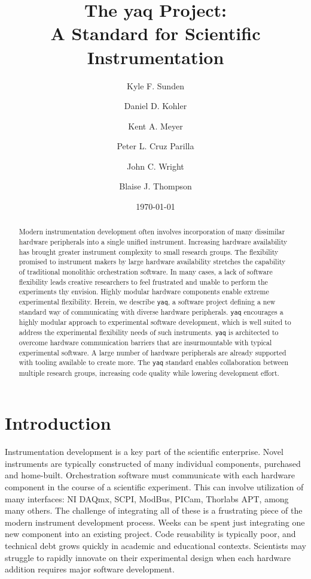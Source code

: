 \documentclass[aip, amsmath, amssymb, reprint,]{revtex4-1}
\newcommand\yaq{\texttt{yaq}}
\begin{document}

\title{The yaq Project: \\ A Standard for Scientific Instrumentation}
\author{Kyle F. Sunden}
\author{Daniel D. Kohler}
\author{Kent A. Meyer}
\author{Peter L. Cruz Parilla}
\author{John C. Wright}
\author{Blaise J. Thompson}

\date{\today}

\begin{abstract}


Modern instrumentation development often involves incorporation of many dissimilar hardware peripherals into a single unified instrument.
Increasing hardware availability has brought greater instrument complexity to small research groups.
The flexibility promised to instrument makers by large hardware availability stretches the capability of traditional monolithic orchestration software.
In many cases, a lack of software flexibility leads creative researchers to feel frustrated and unable to perform the experiments thy envision.
Highly modular hardware components enable extreme experimental flexibility.
Herein, we describe \yaq{}, a software project defining a new standard way of communicating with diverse hardware peripherals.
\yaq{} encourages a highly modular approach to experimental software development, which is well suited to address the experimental flexibility needs of such instruments.
\yaq{} is architected to overcome hardware communication barriers that are insurmountable with typical experimental software.
A large number of hardware peripherals are already supported with tooling available to create more.
The \yaq{} standard enables collaboration between multiple research groups, increasing code quality while lowering development effort.

\end{abstract}

\maketitle

\section{Introduction}

Instrumentation development is a key part of the scientific enterprise.
Novel instruments are typically constructed of many individual components, purchased and home-built.
Orchestration software must communicate with each hardware component in the course of a scientific experiment.
This can involve utilization of many interfaces: NI DAQmx\cite{nidaqmx}, SCPI\cite{scpi}, ModBus\cite{modbus}, PICam\cite{picam}, Thorlabs APT\cite{thorlabs_apt}, among many others.
The challenge of integrating all of these is a frustrating piece of the modern instrument development process.
Weeks can be spent just integrating one new component into an existing project.
Code reusability is typically poor, and technical debt grows quickly in academic and educational contexts.
Scientists may struggle to rapidly innovate on their experimental design when each hardware addition requires major software development.
\end{document}
